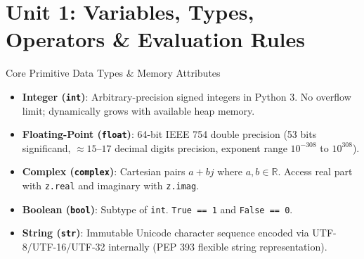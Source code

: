 \chapter{Unit 1: Variables, Types, Operators \& Evaluation Rules}

\begin{formulabox}{Core Primitive Data Types \& Memory Attributes}
\begin{itemize}[leftmargin=1.5em, itemsep=2pt]
    \item \textbf{Integer (\texttt{int})}: Arbitrary-precision signed integers in Python 3. No overflow limit; dynamically grows with available heap memory.
    \item \textbf{Floating-Point (\texttt{float})}: 64-bit IEEE 754 double precision (53 bits significand, $\approx 15$--$17$ decimal digits precision, exponent range $10^{-308}$ to $10^{308}$).
    \item \textbf{Complex (\texttt{complex})}: Cartesian pairs $a + bj$ where $a, b \in \mathbb{R}$. Access real part with \texttt{z.real} and imaginary with \texttt{z.imag}.
    \item \textbf{Boolean (\texttt{bool})}: Subtype of \texttt{int}. \texttt{True == 1} and \texttt{False == 0}.
    \item \textbf{String (\texttt{str})}: Immutable Unicode character sequence encoded via UTF-8/UTF-16/UTF-32 internally (PEP 393 flexible string representation).
\end{itemize}
\end{formulabox}

